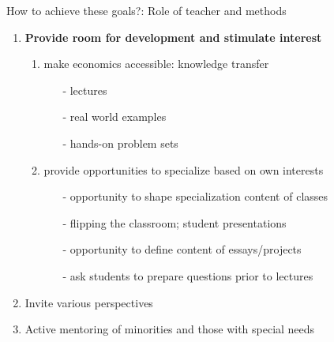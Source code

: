 \begin{frame}{How to achieve these goals?: Role of teacher and\alert{ methods}}
	\begin{enumerate}
		\item \alert{\textbf{Provide room for development and stimulate interest}}
		\begin{enumerate}
			\item make economics accessible: \alert{knowledge transfer} %
			\begin{itemize}
				\item[-] lectures
				\item[-] real world examples
				\item[-] hands-on problem sets
			\end{itemize}
			\item provide \alert{opportunities to specialize} based on own interests %
			\begin{itemize}
				\item[-] opportunity to shape specialization content of classes
				\item[-] flipping the classroom; student presentations
				\item[-] opportunity to define content of essays/projects %
				\item[-] ask students to prepare questions prior to lectures
			\end{itemize}
		\end{enumerate}
		\item Invite various perspectives
		\item Active mentoring of minorities and those with special needs
	\end{enumerate}
\end{frame}




